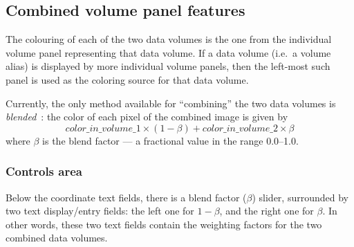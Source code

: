 \subsection{Combined volume panel features}
\label{sec:combined-panel-features}
The colouring of each of the two data volumes is the one from the
individual volume panel representing that data volume. If a data
volume (i.e.\ a volume alias) is displayed by more individual volume
panels, then the left-most such panel is used as the coloring source
for that data volume.

Currently, the only method available for ``combining'' the two data
volumes is {\em blended}\ : the color of each pixel of the combined
image is given by
\[ color\_in\_volume\_1 \times ( 1 - \beta ) + 
color\_in\_volume\_2 \times \beta \] where $\beta$ is the blend factor
--- a fractional value in the range 0.0--1.0.

\subsubsection{Controls area}
Below the coordinate text fields, there is a blend factor ($\beta$)
slider, surrounded by two text display/entry fields: the left one for
$1 - \beta$, and the right one for $\beta$.  In other words, these two
text fields contain the weighting factors for the two combined data
volumes.



